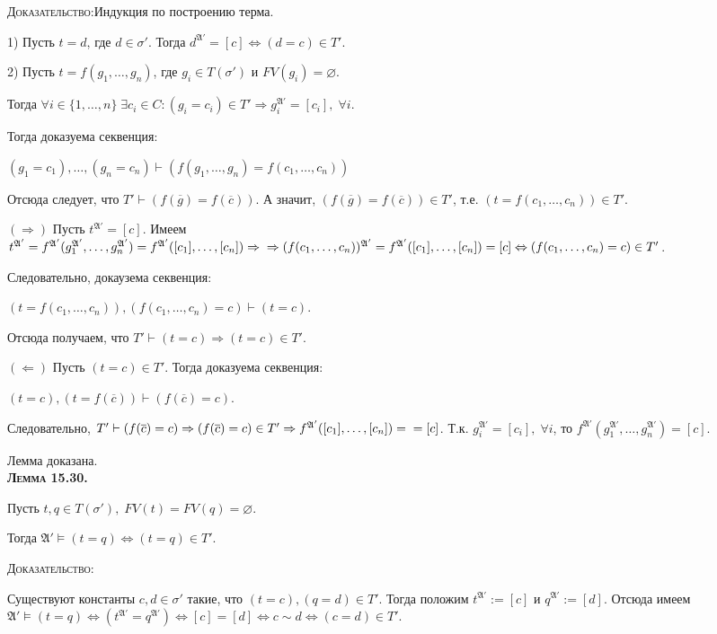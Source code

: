 \documentclass[18pt, a4paper]{extarticle}
\newcommand{\vd}{\vdash}
\newcommand{\vD}{\vDash}
\newcommand{\mA}{\mathfrak{A}}
\newcommand{\dok}{\textsc{Доказательство:}}
\begin{document}
\dok \;Индукция по построению терма.

1) Пусть $t = d$, где $d\in\sigma'$. Тогда $d^{\mA'} = [c]\Leftrightarrow (d=c)\in T'$.

2) Пусть $t = f(g_1,\ldots,g_n)$, где $g_i\in T(\sigma')$ и $FV(g_i) = \varnothing$. 

Тогда $\forall i\in\{1,\ldots,n\}\;\exists c_i\in C: (g_i = c_i)\in T'\Rightarrow g_i^{\mA'} = [c_i], \; \forall i$. 

Тогда доказуема секвенция:

$(g_1 = c_1),\ldots,(g_n = c_n)\vd (f(g_1,\ldots,g_n) = f(c_1,\ldots,c_n))$ 

Отсюда следует, что $T'\vd(f(\overline{g}) = f(\overline{c}))$. А значит, $(f(\overline{g}) = f(\overline{c})) \in T'$, т.е. $(t = f(c_1,\ldots,c_n))\in T'$.

$\boxed{(\Rightarrow)}$ Пусть $t^{\mA'} = [c]$. Имеем $t^{\mA'} = f^{\mA'}(g_1^{\mA'},\ldots,g_n^{\mA'}) = f^{\mA'} ([c_1],\ldots,[c_n])\Rightarrow\\\Rightarrow (f(c_1,\ldots,c_n))^{\mA'} = f^{\mA'}([c_1],\ldots,[c_n]) = [c] \Leftrightarrow (f(c_1,\ldots,c_n) = c)\in T'$.

Следовательно, докаузема секвенция:

$(t = f(c_1,\ldots,c_n)), (f(c_1,\ldots,c_n) = c) \vd (t = c)$.

Отсюда получаем, что $T'\vd (t=c)\Rightarrow (t=c)\in T'$.

$\boxed{(\Leftarrow)}$ Пусть $(t=c)\in T'$. Тогда доказуема секвенция:

$(t=c), (t=f(\overline{c}))\vd (f(\overline{c}) = c)$.

Следовательно, $T'\vd (f(\overline{c}) = c)\Rightarrow (f(\overline{c}) = c)\in T' \Rightarrow f^{\mA'} ([c_1],\ldots,[c_n]) =\\= [c]$. Т.к. $g_i^{\mA'} = [c_i], \; \forall i$, то $ f^{\mA'}(g_1^{\mA'},\ldots,g_n^{\mA'}) = [c]$.

Лемма доказана.\\

\textbf{\textsc{Лемма 15.30.}} 

Пусть $t,q\in T(\sigma'),\;FV(t)=FV(q)=\varnothing$. 

Тогда $\mA'\vD(t=q)\Leftrightarrow(t=q)\in T'$.

\dok 

Существуют константы $c,d\in\sigma'$ такие, что $(t=c),(q=d)\in T'$. Тогда положим $t^{\mA'} := [c]$ и $q^{\mA'} := [d]$. Отсюда имеем $\mA'\vD (t=q)\Leftrightarrow (t^{\mA'} = q^{\mA'})\Leftrightarrow [c] =  [d] \Leftrightarrow c\sim d \Leftrightarrow (c=d)\in T'$.
\end{document}
